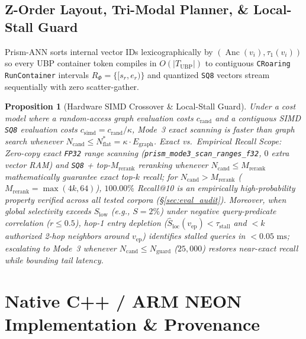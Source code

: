 \documentclass[conference]{IEEEtran}
\newtheorem{proposition}{Proposition}
\begin{document}
\subsection{Z-Order Layout, Tri-Modal Planner, \& Local-Stall Guard}
\label{sec:trimodal}

Prism-ANN sorts internal vector IDs lexicographically by $(\operatorname{Anc}(v_i), \tau_1(v_i))$ so every UBP container token compiles in $O(|T_{\text{UBP}}|)$ to contiguous \texttt{CRoaring} \texttt{RunContainer} intervals $R_\Phi = \{[s_r, e_r)\}$ and quantized \texttt{SQ8} vectors stream sequentially with zero scatter-gather.

\begin{proposition}[Hardware SIMD Crossover \& Local-Stall Guard]
\label{prop:trimodal_crossover}
Under a cost model where a random-access graph evaluation costs $c_{\text{rand}}$ and a contiguous SIMD \texttt{SQ8} evaluation costs $c_{\text{simd}} = c_{\text{rand}} / \kappa$, Mode~3 exact scanning is faster than graph search whenever $N_{\text{cand}} \le N_{\text{flat}}^* = \kappa \cdot E_{\text{graph}}$. \textit{Exact vs.\ Empirical Recall Scope:} Zero-copy exact \texttt{FP32} range scanning (\texttt{prism\_mode3\_scan\_ranges\_f32}, $0$ extra vector RAM) and \texttt{SQ8} + top-$M_{\text{rerank}}$ reranking whenever $N_{\text{cand}} \le M_{\text{rerank}}$ mathematically guarantee exact top-$k$ recall; for $N_{\text{cand}} > M_{\text{rerank}}$ ($M_{\text{rerank}}=\max(4k,64)$), $100.00\%$ Recall@10 is an empirically high-probability property verified across all tested corpora (\S\ref{sec:eval_audit}). Moreover, when global selectivity exceeds $S_{\text{low}}$ (e.g., $S=2\%$) under negative query-predicate correlation ($r \le 0.5$), hop-1 entry depletion ($\hat{S}_{\text{loc}}(v_{\text{ep}}) < \tau_{\text{stall}}$ and $< k$ authorized 2-hop neighbors around $v_{\text{ep}}$) identifies stalled queries in $<0.05\text{ ms}$; escalating to Mode~3 whenever $N_{\text{cand}} \le N_{\text{guard}}$ ($25{,}000$) restores near-exact recall while bounding tail latency.
\end{proposition}

\section{Native C++ / ARM NEON Implementation \& Provenance}
\label{sec:implementation}
\end{document}
